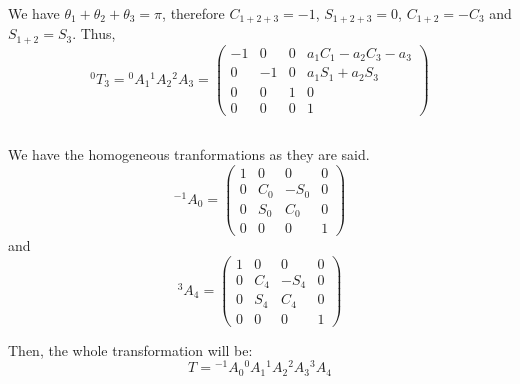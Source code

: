 \documentclass[a4paper,11pt]{article}
\begin{document}
We have $\theta_1 + \theta_2 + \theta_3 = \pi$, therefore $C_{1+2+3} = -1$, $S_{1+2+3} = 0$, $C_{1+2} = -C_3$ and $S_{1+2} = S_3$. Thus,
\[
  ^0T_3 = {}^{0}A_{1} {}^{1}A_{2} {}^{2}A_{3} =
  \begin{pmatrix}
    -1 & 0 & 0 & a_1C_1 - a_2C_3 - a_3 \\
    0 & -1 & 0 & a_1S_1 + a_2S_3 \\
    0 & 0 & 1 & 0 \\
    0 & 0 & 0 & 1
  \end{pmatrix}
\]

\subsection{}
We have the homogeneous tranformations as they are said.
\[
  {}^{-1}A_{0} = 
  \begin{pmatrix}
    1 & 0 & 0 & 0 \\
    0 & C_0 & -S_0 & 0 \\
    0 & S_0 & C_0 & 0 \\
    0 & 0 & 0 & 1
  \end{pmatrix}
\]
and
\[
  {}^{3}A_{4} = 
  \begin{pmatrix}
    1 & 0 & 0 & 0 \\
    0 & C_4 & -S_4 & 0 \\
    0 & S_4 & C_4 & 0 \\
    0 & 0 & 0 & 1
  \end{pmatrix}
\]

Then, the whole transformation will be:
\[
  T = {}^{-1}A_{0} {}^{0}A_{1} {}^{1}A_{2} {}^{2}A_{3} {}^{3}A_{4}
\]
\end{document}
